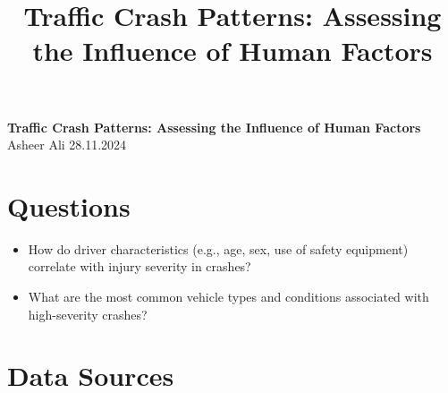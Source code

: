 \documentclass[a4paper,12pt]{article}
\title{Traffic Crash Patterns: Assessing the Influence of Human Factors}
\author{} %
\date{} %
\begin{document}
\begin{center}
    \textbf{\Large Traffic Crash Patterns: Assessing the Influence of Human Factors} \\[1em]
    Asheer Ali \hspace{2cm} 28.11.2024
\end{center}

\section{Questions}
\begin{itemize}
    \item How do driver characteristics (e.g., age, sex, use of safety equipment) correlate with injury severity in crashes?
    \item What are the most common vehicle types and conditions associated with high-severity crashes?
\end{itemize}

\section{Data Sources}
\end{document}
